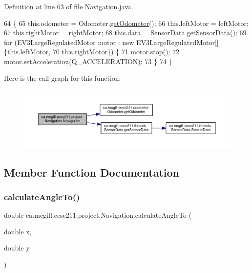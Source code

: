 Definition at line 63 of file Navigation.\+java.


\begin{DoxyCode}
64                                 \{
65     this.odometer = Odometer.\hyperlink{classca_1_1mcgill_1_1ecse211_1_1odometer_1_1_odometer_a99171f11e34dea918fa9dd069d721439}{getOdometer}();
66     this.leftMotor = leftMotor;
67     this.rightMotor = rightMotor;
68     this.data = SensorData.\hyperlink{classca_1_1mcgill_1_1ecse211_1_1threads_1_1_sensor_data_a8260aba53b4474ca1275e4ce26157977}{getSensorData}();
69     \textcolor{keywordflow}{for} (EV3LargeRegulatedMotor motor : \textcolor{keyword}{new} EV3LargeRegulatedMotor[] \{this.leftMotor,
70         this.rightMotor\}) \{
71       motor.stop();
72       motor.setAcceleration(Q\_ACCELERATION);
73     \}
74   \}
\end{DoxyCode}
Here is the call graph for this function\+:\nopagebreak
\begin{figure}[H]
\begin{center}
\leavevmode
\includegraphics[width=350pt]{classca_1_1mcgill_1_1ecse211_1_1project_1_1_navigation_aaee14b67c392ddd951e3ce21224c3e56_cgraph}
\end{center}
\end{figure}


\subsection{Member Function Documentation}
\mbox{\label{classca_1_1mcgill_1_1ecse211_1_1project_1_1_navigation_a4376e54162df8f123ca3b52e4fd2f38d}} 
\subsubsection{\texorpdfstring{calculate\+Angle\+To()}{calculateAngleTo()}}
{\footnotesize\ttfamily double ca.\+mcgill.\+ecse211.\+project.\+Navigation.\+calculate\+Angle\+To (\begin{DoxyParamCaption}\item[{double}]{x,  }\item[{double}]{y }\end{DoxyParamCaption})}

